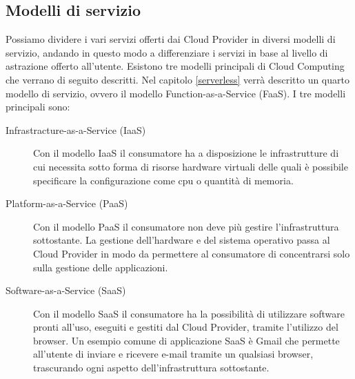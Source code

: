 \subsection{Modelli di servizio}
Possiamo dividere i vari servizi offerti dai Cloud Provider in diversi modelli di servizio, andando in questo modo a differenziare i servizi in base al livello di astrazione offerto all'utente. Esistono tre modelli principali di Cloud Computing \cite{nist} che verrano di seguito descritti. Nel capitolo \ref{serverless} verrà descritto un quarto modello di servizio, ovvero il modello Function-as-a-Service (FaaS).
I tre modelli principali sono:
\begin{description}
    \item[Infrastracture-as-a-Service (IaaS)]Con il modello IaaS il consumatore ha a disposizione le infrastrutture di cui necessita sotto forma di risorse hardware virtuali delle quali è possibile specificare la configurazione come cpu o quantità di memoria.
    
    \item[Platform-as-a-Service (PaaS)]Con il modello PaaS il consumatore non deve più gestire l'infrastruttura sottostante. La gestione dell'hardware e del sistema operativo passa al Cloud Provider in modo da permettere al consumatore di concentrarsi solo sulla gestione delle applicazioni. 

    \item[Software-as-a-Service (SaaS)]Con il modello SaaS il consumatore ha la possibilità di utilizzare software pronti all'uso, eseguiti e gestiti dal Cloud Provider, tramite l'utilizzo del browser. Un esempio comune di applicazione SaaS è Gmail che permette all'utente di inviare e ricevere e-mail tramite un qualsiasi browser, trascurando ogni aspetto dell'infrastruttura sottostante.
\end{description}

